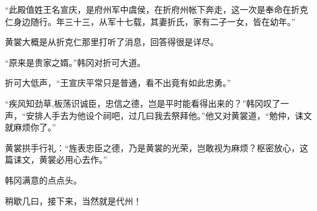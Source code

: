 “此殿值姓王名宣庆，是府州军中虞侯，在折府州帐下奔走，这一次是奉命在折克仁身边随行。年三十三，从军十七载，其妻折氏，家有二子一女，皆在幼年。”

黄裳大概是从折克仁那里打听了消息，回答得很是详尽。

“原来是贵家之婿。”韩冈对折可大道。

折可大低声，“王宣庆平常只是普通，看不出竟有如此忠勇。”

“疾风知劲草,板荡识诚臣，忠信之德，岂是平时能看得出来的？”韩冈叹了一声，“安排人手去为他设个祠吧，过几曰我去祭拜他。”他又对黄裳道，“勉仲，诔文就麻烦你了。”

黄裳拱手行礼：“旌表忠臣之德，乃是黄裳的光荣，岂敢视为麻烦？枢密放心，这篇诔文，黄裳必用心去作。”

韩冈满意的点点头。

稍歇几曰，接下来，当然就是代州！
